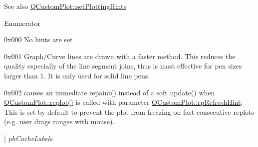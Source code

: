 \begin{DoxySeeAlso}{See also}
\hyperlink{class_q_custom_plot_a94a33cbdadbbac5934843508bcfc210d}{Q\+Custom\+Plot\+::set\+Plotting\+Hints} 
\end{DoxySeeAlso}
\begin{Desc}
\item[Enumerator]\par
\begin{description}
\item[{\em 
ph\+None\hypertarget{namespace_q_c_p_a5400e5fcb9528d92002ddb938c1f4ef4a6a4b80cab7683c4533cb04b27a862fe1}{}\label{namespace_q_c_p_a5400e5fcb9528d92002ddb938c1f4ef4a6a4b80cab7683c4533cb04b27a862fe1}
}]{\ttfamily 0x000} No hints are set \item[{\em 
ph\+Fast\+Polylines\hypertarget{namespace_q_c_p_a5400e5fcb9528d92002ddb938c1f4ef4a016e00979e96542daa49cc14c976dd02}{}\label{namespace_q_c_p_a5400e5fcb9528d92002ddb938c1f4ef4a016e00979e96542daa49cc14c976dd02}
}]{\ttfamily 0x001} Graph/\+Curve lines are drawn with a faster method. This reduces the quality especially of the line segment joins, thus is most effective for pen sizes larger than 1. It is only used for solid line pens. \item[{\em 
ph\+Immediate\+Refresh\hypertarget{namespace_q_c_p_a5400e5fcb9528d92002ddb938c1f4ef4acf4738ba3f53c15dd1ad297f512b813e}{}\label{namespace_q_c_p_a5400e5fcb9528d92002ddb938c1f4ef4acf4738ba3f53c15dd1ad297f512b813e}
}]{\ttfamily 0x002} causes an immediate repaint() instead of a soft update() when \hyperlink{class_q_custom_plot_aa4bfe7d70dbe67e81d877819b75ab9af}{Q\+Custom\+Plot\+::replot()} is called with parameter \hyperlink{class_q_custom_plot_a45d61392d13042e712a956d27762aa39a5349b4ed6366760e34653bc54613a5ad}{Q\+Custom\+Plot\+::rp\+Refresh\+Hint}. This is set by default to prevent the plot from freezing on fast consecutive replots (e.\+g. user drags ranges with mouse). \item[{\em 
ph\+Cache\+Labels\hypertarget{namespace_q_c_p_a5400e5fcb9528d92002ddb938c1f4ef4a3165c7c7d350a5a5813a4105067e2f37}{}\label{namespace_q_c_p_a5400e5fcb9528d92002ddb938c1f4ef4a3165c7c7d350a5a5813a4105067e2f37}
}
\end{description}
\end{Desc}
